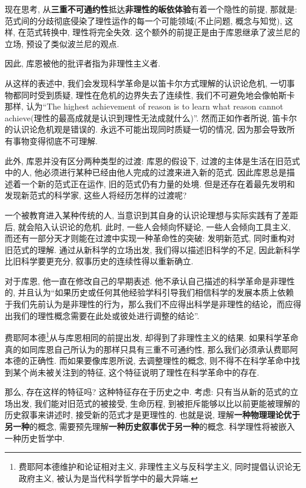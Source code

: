 \documentclass[12pt, a4paper, oneside]{ctexart}
\renewcommand{\b}{\textbf}
\newcommand{\f}{\footnote}
\begin{document}
现在思考, 从\b{三重不可通约性}抵达\b{非理性的皈依体验}有着一个隐性的前提, 那就是: 范式间的分歧彻底侵染了理性运作的每一个可能领域(不止问题, 概念与知觉), 这样, 在范式转换中, 理性将完全失效. 这个额外的前提正是由于库恩继承了波兰尼的立场, 预设了类似波兰尼的观点.

因此, 库恩被他的批评者指为非理性主义者.

从这样的表述中, 我们会发现科学革命是以笛卡尔方式理解的认识论危机, 一切事物都同时受到质疑, 理性在危机的边界失去了连续性, 我们不可避免地会像帕斯卡那样, 认为``The highest achievement of reason is to learn what reason cannot achieve(理性的最高成就是认识到理性无法成就什么)''. 然而正如作者所说, 笛卡尔的认识论危机观是错误的. 永远不可能出现同时质疑一切的情况, 因为那会导致所有事物变得彻底不可理解.

此外, 库恩并没有区分两种类型的过渡: 库恩的假设下, 过渡的主体是生活在旧范式中的人, 他必须进行某种已经由他人完成的过渡来进入新的范式. 因此库恩总是描述着一个新的范式正在运作, 旧的范式仍有力量的处境. 但是还存在着最先发明和发现新范式的科学家, 这些人将经历怎样的过渡呢? 

一个被教育进入某种传统的人, 当意识到其自身的认识论理想与实际实践有了差距后, 就会陷入认识论的危机. 此时, 一些人会倾向怀疑论, 一些人会倾向工具主义, 而还有一部分天才则能在过渡中实现一种革命性的突破: 发明新范式, 同时重构对旧范式的理解. 通过从新科学的立场出发, 我们得以描述旧科学的不足, 因此新科学比旧科学要更充分, 叙事历史的连续性得以重新确立.

对于库恩, 他一直在修改自己的早期表述. 他不承认自己描述的科学革命是非理性的, 并且认为``如果历史或任何其他经验学科引导我们相信科学的发展本质上依赖于我们先前认为是非理性的行为，那么我们不应得出科学是非理性的结论，而应得出我们的理性概念需要在此处或彼处进行调整的结论''.

费耶阿本德\f{费耶阿本德维护和论证相对主义, 非理性主义与反科学主义, 同时提倡认识论无政府主义, 被认为是当代科学哲学中的最大异端.}从与库恩相同的前提出发, 却得到了非理性主义的结果. 如果科学革命真的如同库恩自己所认为的那样只具有三重不可通约性, 那么我们必须承认费耶阿本德的正确性. 而如果要像库恩所说, 去调整理性的概念, 则不得不在科学革命中找到某个尚未被关注到的特征, 这个特征说明了理性在科学革命中的存在. 

那么, 存在这样的特征吗? 这种特征存在于历史之中. 考虑: 只有当从新的范式的立场出发, 我们能对旧范式的被接受, 生命历程, 到被拒斥能够以比以前更能被理解的历史叙事来讲述时, 接受新的范式才是更理性的. 也就是说, 理解\b{一种物理理论优于另一种}的概念, 需要预先理解\b{一种历史叙事优于另一种}的概念. 科学理性将被嵌入一种历史哲学中.
\end{document}
